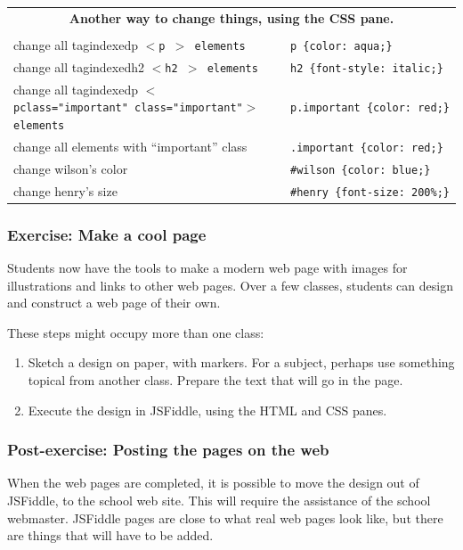 \documentclass[11pt]{article}
\makeatletter
\newcommand{\tag}[2][\relax]{%
  \ifcsname tagindexed#2\endcsname\relax\else%
  \index{#2@\texttt{$<$#2$>$}}%
  \expandafter\gdef\csname tagindexed#2\endcsname{\relax}\fi%
  \bgroup\tt$<$#2\ifx#1\relax\relax\else~#1\fi$>$\egroup}
\makeatother
\begin{document}
\begin{tabular}{ll} \\
\multicolumn{2}{c}{\bf Another way to change things, using the
  CSS pane.} \\
&\\

change all \tag{p} elements & {\tt p~\{color:~aqua;\}} \\
change all \tag{h2} elements & {\tt h2~\{font-style:~italic;\}} \\
change all \tag[class="important"]{p} elements & {\tt p.important~\{color:~red;\}} \\
change all elements with ``important'' class & {\tt .important~\{color:~red;\}} \\
change wilson's color & {\tt \#wilson~\{color:~blue;\}} \\
change henry's size   & {\tt \#henry~\{font-size:~200\%;\}} \\

\end{tabular}


\subsubsection{Exercise: Make a cool page}

Students now have the tools to make a modern web page with
images for illustrations and links to other web pages.  Over a few
classes, students can design and construct a web page of their own.

These steps might occupy more than one class:

\begin{enumerate}

\item Sketch a design on paper, with markers.  For a subject, perhaps
  use something topical from another class.  Prepare the text that
  will go in the page.

\item Execute the design in JSFiddle, using the HTML and CSS panes.

\end{enumerate}

\subsubsection{Post-exercise: Posting the pages on the web}

When the web pages are completed, it is possible to move the design
out of JSFiddle, to the school web site.  This will require the
assistance of the school webmaster.  JSFiddle pages are close to what
real web pages look like, but there are things that will have to
be added.
\end{document}
